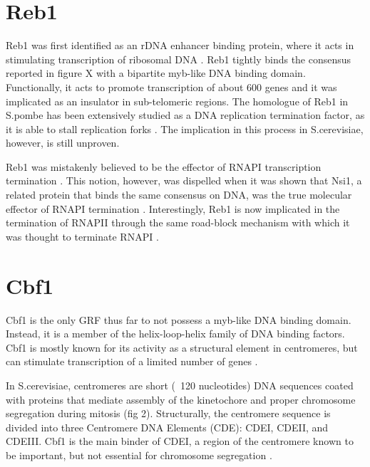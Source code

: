 \section{Reb1}

Reb1 was first identified as an rDNA enhancer binding protein, where it acts in stimulating transcription of ribosomal DNA \cite{planta:1995:global}. 
Reb1 tightly binds the consensus reported in figure X with a bipartite myb-like DNA binding domain.
Functionally, it acts to promote transcription of about 600 genes and it was implicated as an insulator in sub-telomeric regions. 
The homologue of Reb1 in S.pombe has been extensively studied as a DNA replication termination factor, as it is able to stall replication forks \cite{sa:2004:transcription}. The implication in this process in S.cerevisiae, however, is still unproven.


Reb1 was mistakenly believed to be the effector of RNAPI transcription termination \cite{lang:1995:transcription}. 
This notion, however, was dispelled when it was shown that Nsi1, a related protein that binds the same consensus on DNA, was the true molecular effector of RNAPI termination \cite{reiter:2012:reb1homologue}. 
Interestingly, Reb1 is now implicated in the termination of RNAPII through the same road-block mechanism with which it was thought to terminate RNAPI \cite{colin:2014:roadblock}.


\section{Cbf1}

Cbf1 is the only GRF thus far to not possess a myb-like DNA binding domain. Instead, it is a member of the helix-loop-helix family of DNA binding factors. 
Cbf1 is mostly known for its activity as a structural element in centromeres, but can stimulate transcription of a limited number of genes \cite{mellor:1990:cpf1}.


In S.cerevisiae, centromeres are short (~120 nucleotides) DNA sequences coated with proteins that mediate assembly of the kinetochore and proper chromosome segregation during mitosis (fig 2). 
Structurally, the centromere sequence is divided into three Centromere DNA Elements (CDE): CDEI, CDEII, and CDEIII. Cbf1 is the main binder of CDEI, a region of the centromere known to be important, but not essential for chromosome segregation \cite{niedenthal:1993:cpf1}. 

